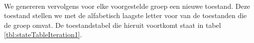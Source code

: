 \paragraph{}
We genereren vervolgens voor elke voorgestelde groep een nieuwe toestand. Deze toestand stellen we met de alfabetisch laagste letter voor van de toestanden die de groep omvat. De toestandstabel die hieruit voortkomt staat in tabel \ref{tbl:stateTableIteration1}.
\begin{table}[hbt]
\centering
{}
\caption{Evolutie van de toestandstabel bij het minimaliseren voor en na twee iteraties.}
\end{table}

